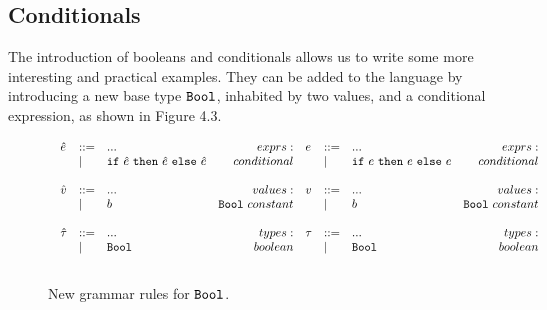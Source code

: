\subsection{Conditionals}

The introduction of booleans and conditionals allows us to write some more interesting and practical examples. They can be added to the language by introducing a new base type $\mathtt{Bool}$, inhabited by two values, and a conditional expression, as shown in Figure 4.3.

\begin{figure}[h]

\[
\begin{array}{c}

\begin{array}{lllr}

\hat e & ::= & ... & exprs: \\
	& | & \mathtt{if}~ \hat e~ \mathtt{then}~ \hat e~\mathtt{else}~ \hat e & conditional \\
	&&\\

\hat v & ::= & ... & values: \\
	& | & b & \mathtt{Bool}~constant \\
	&&\\
	
\hat \tau & ::= & ... & types: \\
	& | & \mathtt{Bool} & boolean \\
	&&\\

\end{array}

\begin{array}{lllr}

e & ::= & ... & exprs: \\
	& | & \mathtt{if}~ e~ \mathtt{then}~ e~\mathtt{else}~ e & conditional \\
	&&\\

v & ::= & ... & values: \\
	& | & b & \mathtt{Bool}~constant \\
	&&\\
		
\tau & ::= & ... & types: \\
	& | & \mathtt{Bool} & boolean \\
	&&\\

\end{array}

\end{array}
\]

\vspace{-12pt}
\caption{New grammar rules for $\mathtt{Bool}$.}
\label{A sample. }
\end{figure}

